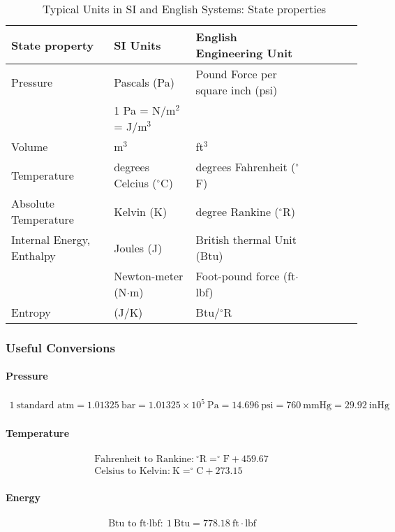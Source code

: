 \begin{table*}[h]
\small
  \caption{\ Typical Units in SI and English Systems: State properties}
  \label{tbl:units}
  \begin{tabular*}{\textwidth}{@{\extracolsep{\fill}}lllllll}
    \hline
    State property & SI Units  & English Engineering Unit \\
    \hline
    Pressure & Pascals (Pa) &  Pound Force per square inch (psi) \\
      & 1 Pa = N/m$^2$ = J/m$^3$ &  \\
    Volume & m$^3$ &  ft$^3$ \\
    Temperature & degrees Celcius ($^{\circ}$C) &  degrees Fahrenheit ($^{\circ}$F) \\
    Absolute Temperature & Kelvin (K) &  degree Rankine ($^{\circ}$R) \\
    Internal Energy, Enthalpy & Joules (J) &  British thermal Unit (Btu) \\
     & Newton-meter (N$\cdot$m) & Foot-pound force (ft$\cdot$lbf)\\
    Entropy  &  (J/K) & Btu/$^{\circ}$R \\
  \end{tabular*}
\end{table*}
\subsubsection{Useful Conversions}
\paragraph{Pressure}
\begin{align*}
  1~\textrm{standard atm} = 1.01325 ~\textrm{bar} = 1.01325 \times 10^{5} ~\textrm{Pa} = 14.696~\textrm{psi} = 760~\textrm{mmHg} = 29.92~\textrm{inHg}  
\end{align*}

\paragraph{Temperature}
\begin{align*}
    \textrm{Fahrenheit to Rankine:}~ ^{\circ}\textrm{R} = ^{\circ}\textrm{F} + 459.67\\
    \textrm{Celsius to Kelvin:}~ \textrm{K} = ^{\circ}\textrm{C} + 273.15
\end{align*}
\paragraph{Energy}
\begin{align*}
    \textrm{Btu to ft$\cdot$lbf:}~ 1~\textrm{Btu} = 778.18~ \textrm{ft}\cdot\textrm{lbf}
\end{align*}
